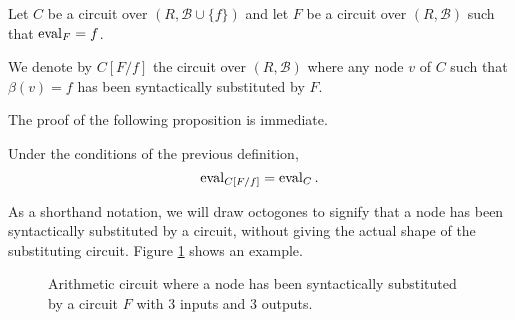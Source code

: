 \begin{definition}
  \label{def:sem-subst}
  Let $C$ be a circuit over $(R,\mathcal{B}\cup\{f\})$ and let $F$ be
  a circuit over $(R,\mathcal{B})$ such that $\operatorname{eval}_F=f$.

  We denote by $C[F/f]$ the circuit over $(R,\mathcal{B})$ where any
  node $v$ of $C$ such that $\beta(v)=f$ has been syntactically
  substituted by $F$.
\end{definition}

The proof of the following proposition is immediate.

\begin{proposition}
  Under the conditions of the previous definition,
  \[\operatorname{eval}_{C[F/f]} = \operatorname{eval}_C \text{.}\]
\end{proposition}

As a shorthand notation, we will draw octogones to signify that a node
has been syntactically substituted by a circuit, without giving the
actual shape of the substituting circuit. Figure
\ref{fig:substitution} shows an example.

\begin{figure}[!ht]
  \label{fig:substitution}
  \centering
  \caption{Arithmetic circuit where a node has been syntactically
    substituted by a circuit $F$ with $3$ inputs and $3$ outputs.}
\end{figure}



